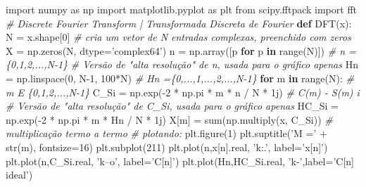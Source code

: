 \documentclass[]{article}
\newenvironment{Shaded}{}{}
\newcommand{\BuiltInTok}[1]{#1}
\newcommand{\CommentTok}[1]{\textcolor[rgb]{0.38,0.63,0.69}{\textit{#1}}}
\newcommand{\ControlFlowTok}[1]{\textcolor[rgb]{0.00,0.44,0.13}{\textbf{#1}}}
\newcommand{\DecValTok}[1]{\textcolor[rgb]{0.25,0.63,0.44}{#1}}
\newcommand{\ImportTok}[1]{#1}
\newcommand{\KeywordTok}[1]{\textcolor[rgb]{0.00,0.44,0.13}{\textbf{#1}}}
\newcommand{\NormalTok}[1]{#1}
\newcommand{\OperatorTok}[1]{\textcolor[rgb]{0.40,0.40,0.40}{#1}}
\newcommand{\StringTok}[1]{\textcolor[rgb]{0.25,0.44,0.63}{#1}}
\begin{document}
\begin{Shaded}
\begin{Highlighting}[numbers=left,,]
\ImportTok{import}\NormalTok{ numpy }\ImportTok{as}\NormalTok{ np}
\ImportTok{import}\NormalTok{ matplotlib.pyplot }\ImportTok{as}\NormalTok{ plt}
\ImportTok{from}\NormalTok{ scipy.fftpack }\ImportTok{import}\NormalTok{ fft}
\CommentTok{# Discrete Fourier Transform | Transformada Discreta de Fourier}
\KeywordTok{def}\NormalTok{ DFT(x):}
\NormalTok{  N }\OperatorTok{=}\NormalTok{ x.shape[}\DecValTok{0}\NormalTok{]}
  \CommentTok{# cria um vetor de N entradas complexas, preenchido com zeros}
\NormalTok{  X }\OperatorTok{=}\NormalTok{ np.zeros(N, dtype}\OperatorTok{=}\StringTok{'complex64'}\NormalTok{)}
\NormalTok{  n }\OperatorTok{=}\NormalTok{ np.array([p }\ControlFlowTok{for}\NormalTok{ p }\KeywordTok{in} \BuiltInTok{range}\NormalTok{(N)]) }\CommentTok{# n = \{0,1,2,...,N-1\}}
  \CommentTok{# Versão de "alta resolução" de n, usada para o gráfico apenas}
\NormalTok{  Hn }\OperatorTok{=}\NormalTok{ np.linspace(}\DecValTok{0}\NormalTok{, N}\DecValTok{-1}\NormalTok{, }\DecValTok{100}\OperatorTok{*}\NormalTok{N) }\CommentTok{# Hn =\{0,...,1,...,2,...,N-1\}}
  \ControlFlowTok{for}\NormalTok{ m }\KeywordTok{in} \BuiltInTok{range}\NormalTok{(N): }\CommentTok{# m E \{0,1,2,...,N-1\}}
\NormalTok{    C_Si }\OperatorTok{=}\NormalTok{ np.exp(}\OperatorTok{-}\DecValTok{2} \OperatorTok{*}\NormalTok{ np.pi }\OperatorTok{*}\NormalTok{ m }\OperatorTok{*}\NormalTok{ n }\OperatorTok{/}\NormalTok{ N }\OperatorTok{*}\NormalTok{ 1j) }\CommentTok{# C(m) - S(m) i}
    \CommentTok{# Versão de "alta resolução" de C_Si, usada para o gráfico apenas}
\NormalTok{    HC_Si }\OperatorTok{=}\NormalTok{ np.exp(}\OperatorTok{-}\DecValTok{2} \OperatorTok{*}\NormalTok{ np.pi }\OperatorTok{*}\NormalTok{ m }\OperatorTok{*}\NormalTok{ Hn }\OperatorTok{/}\NormalTok{ N }\OperatorTok{*}\NormalTok{ 1j)}
\NormalTok{    X[m] }\OperatorTok{=} \BuiltInTok{sum}\NormalTok{(np.multiply(x, C_Si)) }\CommentTok{# multiplicação termo a termo}
    \CommentTok{# plotando:}
\NormalTok{    plt.figure(}\DecValTok{1}\NormalTok{)}
\NormalTok{    plt.suptitle(}\StringTok{'M ='} \OperatorTok{+} \BuiltInTok{str}\NormalTok{(m), fontsize}\OperatorTok{=}\DecValTok{16}\NormalTok{)}
\NormalTok{    plt.subplot(}\DecValTok{211}\NormalTok{)}
\NormalTok{    plt.plot(n,x[n].real, }\StringTok{'k:.'}\NormalTok{, label}\OperatorTok{=}\StringTok{'x[n]'}\NormalTok{)}
\NormalTok{    plt.plot(n,C_Si.real, }\StringTok{'k--o'}\NormalTok{, label}\OperatorTok{=}\StringTok{'C[n]'}\NormalTok{)}
\NormalTok{    plt.plot(Hn,HC_Si.real, }\StringTok{'k-'}\NormalTok{,label}\OperatorTok{=}\StringTok{'C[n] ideal'}\NormalTok{)}

\end{Highlighting}
\end{Shaded}
\end{document}
